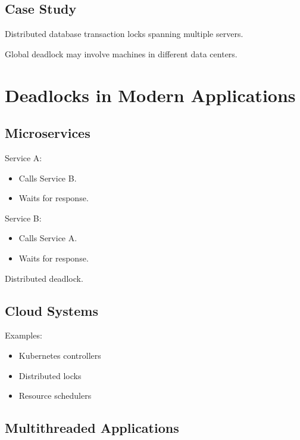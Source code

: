\subsection{Case Study}

Distributed database transaction locks spanning multiple servers.

Global deadlock may involve machines in different data centers.

\section{Deadlocks in Modern Applications}

\subsection{Microservices}

Service A:

\begin{itemize}
\item Calls Service B.
\item Waits for response.
\end{itemize}

Service B:

\begin{itemize}
\item Calls Service A.
\item Waits for response.
\end{itemize}

Distributed deadlock.

\subsection{Cloud Systems}

Examples:

\begin{itemize}
\item Kubernetes controllers
\item Distributed locks
\item Resource schedulers
\end{itemize}

\subsection{Multithreaded Applications}

